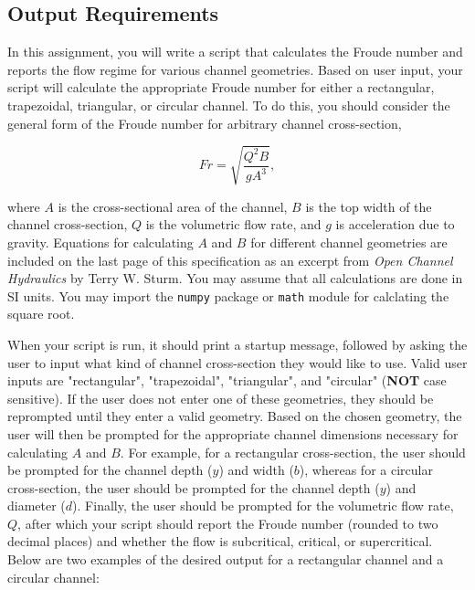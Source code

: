 \documentclass{homework}
\begin{document}
\subsection*{Output Requirements}
In this assignment, you will write a script that calculates the Froude number and reports the flow regime for various channel geometries. Based on user input, your script will calculate the appropriate Froude number for either a rectangular, trapezoidal, triangular, or circular channel. To do this, you should consider the general form of the Froude number for arbitrary channel cross-section,

\begin{equation}
    Fr = \sqrt{\frac{Q^2 B}{g A^3}} ,
\end{equation}

where $A$ is the cross-sectional area of the channel, $B$ is the top width of the channel cross-section, $Q$ is the volumetric flow rate, and $g$ is acceleration due to gravity. Equations for calculating $A$ and $B$ for different channel geometries are included on the last page of this specification as an excerpt from \textit{Open Channel Hydraulics} by Terry W. Sturm. You may assume that all calculations are done in SI units. You may import the \texttt{numpy} package or \texttt{math} module for calclating the square root.

When your script is run, it should print a startup message, followed by asking the user to input what kind of channel cross-section they would like to use. Valid user inputs are "rectangular", "trapezoidal", "triangular", and "circular" (\textbf{NOT} case sensitive). If the user does not enter one of these geometries, they should be reprompted until they enter a valid geometry. Based on the chosen geometry, the user will then be prompted for the appropriate channel dimensions necessary for calculating $A$ and $B$. For example, for a rectangular cross-section, the user should be prompted for the channel depth ($y$) and width ($b$), whereas for a circular cross-section, the user should be prompted for the channel depth ($y$) and diameter ($d$). Finally, the user should be prompted for the volumetric flow rate, $Q$, after which your script should report the Froude number (rounded to two decimal places) and whether the flow is subcritical, critical, or supercritical. Below are two examples of the desired output for a rectangular channel and a circular channel:


\end{document}
